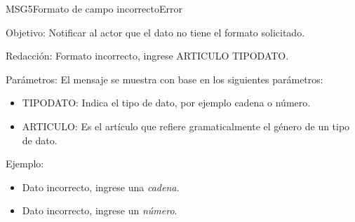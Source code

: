 \begin{mensaje}{MSG5}{Formato de campo incorrecto}{Error}
	\item [Objetivo:] Notificar al actor que el dato no tiene el formato solicitado.
	\item[Redacción:] Formato incorrecto, ingrese ARTICULO TIPODATO.
	\item[Parámetros:] El mensaje se muestra con base en los siguientes parámetros:
		\begin{itemize}
 			\item TIPODATO: Indica el tipo de dato, por ejemplo cadena o número.
 			\item ARTICULO: Es el artículo que refiere gramaticalmente el género de un tipo de dato.
		\end{itemize}
	\item[Ejemplo:] \begin{itemize}
		\item Dato incorrecto, ingrese una {\em cadena}.
		\item Dato incorrecto, ingrese un {\em número}.
	\end{itemize}
\end{mensaje}